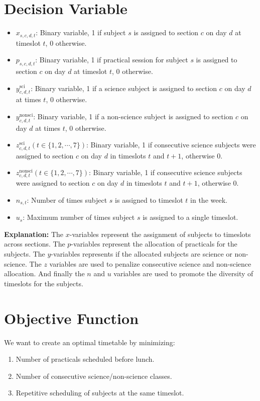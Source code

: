 \documentclass[11pt]{article}
\begin{document}
\section*{Decision Variable}
\begin{itemize}
    \item $x_{s,c,d,t}$: Binary variable, 1 if subject \(s\) is assigned to section \(c\) on day \(d\) at timeslot \(t\), 0 otherwise.
    \item $p_{s,c,d,t}$: Binary variable, 1 if practical session for subject \(s\) is assigned to section \(c\) on day \(d\) at timeslot \(t\), 0 otherwise.
    \item $y_{c,d,t}^{\text{sci}}$: Binary variable, 1 if a science subject is assigned to section \(c\) on day \(d\) at times \(t\), 0 otherwise.
    \item $y_{c,d,t}^{\text{nonsci}}$: Binary variable, 1 if a non-science subject is assigned to section \(c\) on day \(d\) at times \(t\), 0 otherwise.
    \item $z_{c,d,t}^{\text{sci}} (t \in \{1,2,\cdots,7\})$: Binary variable, 1 if consecutive science subjects were assigned to section \(c\) on day \(d\) in timeslots \(t\) and \(t+1\), otherwise 0.
    \item $z_{c,d,t}^{\text{nonsci}} (t \in \{1,2,\cdots,7\})$: Binary variable, 1 if consecutive science subjects were assigned to section \(c\) on day \(d\) in timeslots \(t\) and \(t+1\), otherwise 0.
    \item $n_{s,t}$: Number of times subject \(s\) is assigned to timeslot \(t\) in the week.
    \item $u_{s}$: Maximum number of times subject \(s\) is assigned to a single timeslot.
\end{itemize}
\textbf{Explanation:} The \(x\)-variables represent the assignment of subjects to timeslots across sections. The \(p\)-variables represent the allocation of practicals for the subjects. The \(y\)-variables represents if the allocated subjects are science or non-science. The \(z\) variables are used to penalize consecutive science and non-science allocation. And finally the \(n\) and \(u\) variables are used to promote the diversity of timeslots for the subjects.

\section*{Objective Function}
We want to create an optimal timetable by minimizing:
\begin{enumerate}
    \item Number of practicals scheduled before lunch.
    \item Number of consecutive science/non-science classes.
    \item Repetitive scheduling of subjects at the same timeslot.
\end{enumerate}
\end{document}
